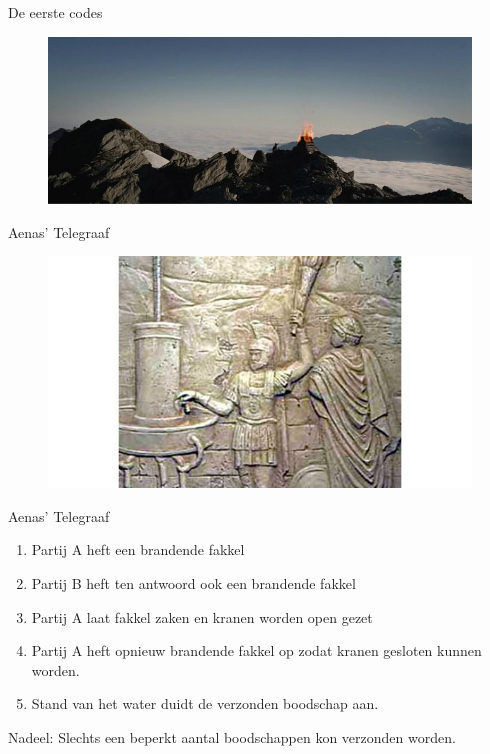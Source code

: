 \documentclass{beamer}
\begin{document}
\begin{frame}{De eerste codes}
	\begin{figure}
		\includegraphics[width=\textwidth]{img/toorts.jpg}
	\end{figure}
\end{frame}




\begin{frame}{Aenas' Telegraaf}
\begin{figure}
	\includegraphics[width=\textwidth]{img/aenas.jpg}
\end{figure}
\end{frame}

\begin{frame}{Aenas' Telegraaf}
\begin{enumerate}
\item Partij A heft een brandende fakkel
\item Partij B heft ten antwoord ook een brandende fakkel
\item Partij A laat fakkel zaken en kranen worden open gezet
\item Partij A heft opnieuw brandende fakkel op zodat kranen gesloten kunnen worden.
\item Stand van het water duidt de verzonden boodschap aan.
\end{enumerate}

\pause 
Nadeel: Slechts een beperkt aantal boodschappen kon verzonden worden.
\end{frame}
\end{document}
